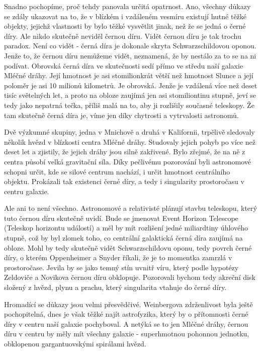  Snadno pochopíme, proč tehdy panovala určitá opatrnost. Ano, všechny důkazy se zdály ukazovat na
  to, že v blízkém i vzdáleném vesmíru existují hutné těžké objekty, jejichž vlastnosti by bylo
  těžké vysvětlit jinak, než že se jedná o černé díry. Ale nikdo skutečně neviděl černou díru. Vidět
  černou díru je tak trochu paradox. Není co vidět - černá díra je dokonale skryta Schwarzschildovou
  oponou. Jenže to, že černou díru nemůžeme vidět, neznamená, že by nestálo za to se na ni podívat.
  Obrovská černá díra ve skutečnosti sedí přímo ve středu naší galaxie Mléčné dráhy. Její hmotnost
  je asi stomilionkrát větší než hmotnost Slunce a její poloměr je asi 10 milionů kilometrů. Je
  obrovská. Jenže je vzdálená více než deset tisíc světelných let, a proto na obloze zaujímá jen asi
  stomiliontinu stupně, jeví se tedy jako nepatrná tečka, příliš malá na to, aby ji rozlišily
  současné teleskopy. Že tam skutečně černá díra je, víme jen díky chytrosti a vytrvalosti
  astronomů. 
  
  Dvě výzkumné skupiny, jedna v Mnichově a druhá v Kalifornii, trpělivě sledovaly několik hvězd v
  blízkosti centra Mléčné dráhy. Studovaly jejich pohyb po více než deset let a zjistily, že jejich
  dráhy jsou silně zakřivené. Bylo zřejmé, že na ně z centra působí velká gravitační síla. Díky
  pečlivému pozorování byli astronomové schopni určit, kde se silové centrum nachází, i určit
  hmotnost centrálního objektu. Prokázali tak existenci černé díry, a tedy i singularity
  prostoročasu v centru galaxie. 
  
  Ale ani to není všechno. Astronomové a relativisté plánují stavbu teleskopu, který tuto černou
  díru skutečně uvidí. Bude se jmenovat Event Horizon Telescope (Teleskop horizontu událostí) a měl
  by mít rozlišení jedné miliardtiny úhlového stupně, což by byl zlomek toho, co centrální
  galaktická černá díra zaujímá na obloze. Mohl by tedy skutečně vidět Schwarzschildovu oponu, tedy
  povrch černé díry, o kterém Oppenheimer a Snyder říkali, že je to momentka zamrzlá v prostoročase.
  Jevila by se jako temný stín uvnitř víru, který podle hypotézy Zeldoviče a Novikova černou díru
  obklopuje. Pozorovali bychom tedy akreční disk složený z hvězd, plynu a prachu, který singularita
  vtahuje do černé díry. 
  
  Hromadící se důkazy jsou velmi přesvědčivé. Weinbergova zdrženlivost byla ještě pochopitelná, dnes
  je však těžké najít astrofyzika, který by o přítomnosti černé díry v centru naší galaxie
  pochyboval. A netýká se to jen Mléčné dráhy, černou díru v centru by měly mít všechny galaxie -
  superhmotnou pohonnou jednotku, obklopenou gargantuovskými spirálami hvězd. 
  
